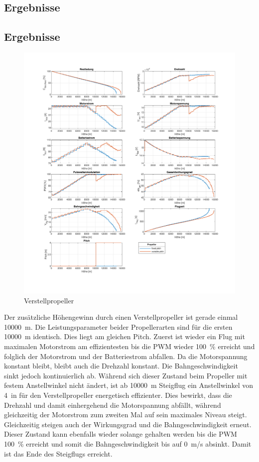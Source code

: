 \subsection{Ergebnisse}
\subsection{Ergebnisse}
\begin{figure}[H]
	\includegraphics[scale=0.7]{Diagramme/Verstellpropeller.pdf}
	\caption{Verstellpropeller}
	\label{abb:verstellpropeller}
\end{figure}
Der zusätzliche Höhengewinn durch einen Verstellpropeller ist gerade einmal \SI{10000}{m}. Die Leistungsparameter beider Propellerarten sind für die ersten \SI{10000}{m} identisch. Dies liegt am gleichen Pitch. Zuerst ist wieder ein Flug mit maximalen Motorstrom am effizientesten bis die PWM wieder \SI{100}{\%} erreicht und folglich der Motorstrom und der Batteriestrom abfallen. Da die Motorspannung konstant bleibt, bleibt auch die Drehzahl konstant. Die Bahngeschwindigkeit sinkt jedoch kontinuierlich ab. Während sich dieser Zustand beim Propeller mit festem Anstellwinkel nicht ändert, ist ab \SI{10000}{m} Steigflug ein Anstellwinkel von \SI{4}{in} für den Verstellpropeller energetisch effizienter. Dies bewirkt, dass die Drehzahl und damit einhergehend die Motorspannung abfällt, während gleichzeitig der Motorstrom zum zweiten Mal auf sein maximales Niveau steigt. Gleichzeitig steigen auch der Wirkungsgrad und die Bahngeschwindigkeit erneut. Dieser Zustand kann ebenfalls wieder solange gehalten werden bis die PWM \SI{100}{\%} erreicht und somit die Bahngeschwindigkeit bis auf \SI{0}{m/s} absinkt. Damit ist das Ende des Steigflugs erreicht. \\
